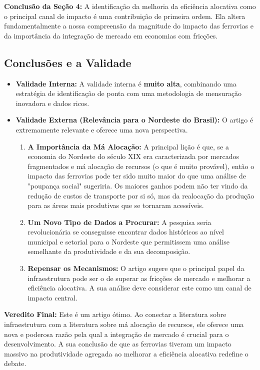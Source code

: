 \documentclass[12pt, a4paper]{article}
\begin{document}
\noindent\textbf{Conclusão da Seção 4:} A identificação da melhoria da eficiência alocativa como o principal canal de impacto é uma contribuição de primeira ordem. Ela altera fundamentalmente a nossa compreensão da magnitude do impacto das ferrovias e da importância da integração de mercado em economias com fricções.

\subsection{Conclusões e a Validade}
\begin{itemize}
    \item \textbf{Validade Interna:} A validade interna é \textbf{muito alta}, combinando uma estratégia de identificação de ponta com uma metodologia de mensuração inovadora e dados ricos.
    \item \textbf{Validade Externa (Relevância para o Nordeste do Brasil):} O artigo é extremamente relevante e oferece uma nova perspectiva.
        \begin{enumerate}
            \item \textbf{A Importância da Má Alocação:} A principal lição é que, se a economia do Nordeste do século XIX era caracterizada por mercados fragmentados e má alocação de recursos (o que é muito provável), então o impacto das ferrovias pode ter sido muito maior do que uma análise de "poupança social" sugeriria. Os maiores ganhos podem não ter vindo da redução de custos de transporte por si só, mas da realocação da produção para as áreas mais produtivas que se tornaram acessíveis.
            \item \textbf{Um Novo Tipo de Dados a Procurar:} A pesquisa seria revolucionária se conseguisse encontrar dados históricos ao nível municipal e setorial para o Nordeste que permitissem uma análise semelhante da produtividade e da sua decomposição.
            \item \textbf{Repensar os Mecanismos:} O artigo sugere que o principal papel da infraestrutura pode ser o de superar as fricções de mercado e melhorar a eficiência alocativa. A sua análise deve considerar este como um canal de impacto central.
        \end{enumerate}
\end{itemize}

\noindent\textbf{Veredito Final:} Este é um artigo ótimo. Ao conectar a literatura sobre infraestrutura com a literatura sobre má alocação de recursos, ele oferece uma nova e poderosa razão pela qual a integração de mercado é crucial para o desenvolvimento. A sua conclusão de que as ferrovias tiveram um impacto massivo na produtividade agregada ao melhorar a eficiência alocativa redefine o debate. 
\end{document}
